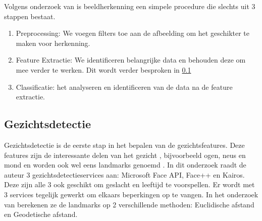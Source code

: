 Volgens onderzoek van \textcite{BasystiukMR23} is beeldherkenning een simpele procedure die slechts uit 3 stappen bestaat. 
\begin{enumerate}
    \item Preprocessing: We voegen filters toe aan de afbeelding om het geschikter te maken voor herkenning.
    \item Feature Extractie: We identificeren belangrijke data en behouden deze om mee verder te werken. Dit wordt verder besproken in \ref{sub:gezichtsdetectie}
    \item Classificatie: het analyseren en identificeren van de  data na de feature extractie.
\end{enumerate}

\subsection{Gezichtsdetectie}
\label{sub:gezichtsdetectie}
Gezichtsdetectie is de eerste stap in het bepalen van de gezichtsfeatures. Deze features zijn de interessante delen van het gezicht , bijvoorbeeld ogen, neus en mond en worden ook wel eens landmarks genoemd \autocite{Coppens2018}. In dit onderzoek raadt de auteur 3 gezichtsdetectieservices aan: Microsoft Face API, Face++ en Kairos. Deze zijn alle 3 ook geschikt om geslacht en leeftijd te voorspellen. Er wordt met 3 services tegelijk gewerkt om elkaars beperkingen op te vangen.
In het onderzoek van \textcite{Sanil2023} berekenen ze de landmarks op 2 verschillende methoden: Euclidische afstand en Geodetische afstand.

